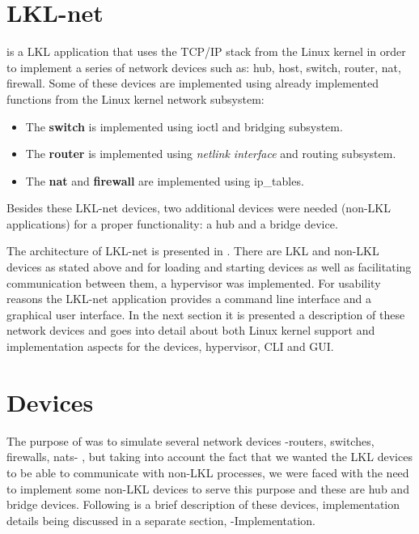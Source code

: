 \begin{itemize}
\section{LKL-net}
\label{sec:lkl-net}
\textbf{\project} is a LKL application that uses the  TCP/IP stack from the Linux kernel in order to implement a series of network devices such as: hub, host, switch, router, nat, firewall. Some of these devices are implemented using already implemented functions from the Linux kernel network subsystem: 
\begin{itemize}
\item The \textbf{switch} is implemented using ioctl and bridging subsystem. 
\item The \textbf{router} is implemented using \textit{netlink interface} and routing subsystem.
\item The \textbf{nat} and \textbf{firewall} are implemented using ip_tables. 
\end{itemize} 
Besides these LKL-net devices, two additional devices were needed (non-LKL applications) for a proper functionality: a hub and a bridge device.

The architecture of LKL-net is presented in .
There are LKL and non-LKL devices as stated above and for loading and starting devices as well as facilitating communication between them, a hypervisor was implemented. For usability reasons the LKL-net application provides a command line interface and a graphical user interface.
In the next section it is presented a description of these network devices and  goes into detail about both Linux kernel support and implementation aspects for the devices, hypervisor, CLI and GUI. 
\section{Devices}
\label{sec:devices}
The purpose of \project was to simulate several network devices -routers, switches, firewalls, nats- , but taking into account the fact that we wanted the LKL devices to be able to communicate with non-LKL processes, we were faced with the need to implement some non-LKL devices to serve this purpose and these are hub and bridge devices.
Following is a brief description of these devices, implementation details being discussed in a separate section,  -Implementation.

\end{itemize}
